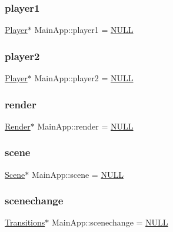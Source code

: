 \subsubsection{\texorpdfstring{player1}{player1}}
{\footnotesize\ttfamily \mbox{\hyperlink{class_player}{Player}}$\ast$ Main\+App\+::player1 = \mbox{\hyperlink{_defs_8h_a070d2ce7b6bb7e5c05602aa8c308d0c4}{N\+U\+LL}}}

\mbox{\label{class_main_app_a294df033f18318eb240fa8e991ec0811}} 
\subsubsection{\texorpdfstring{player2}{player2}}
{\footnotesize\ttfamily \mbox{\hyperlink{class_player}{Player}}$\ast$ Main\+App\+::player2 = \mbox{\hyperlink{_defs_8h_a070d2ce7b6bb7e5c05602aa8c308d0c4}{N\+U\+LL}}}

\mbox{\label{class_main_app_aa75ce242cddd00557eb67cf8d098454d}} 
\subsubsection{\texorpdfstring{render}{render}}
{\footnotesize\ttfamily \mbox{\hyperlink{class_render}{Render}}$\ast$ Main\+App\+::render = \mbox{\hyperlink{_defs_8h_a070d2ce7b6bb7e5c05602aa8c308d0c4}{N\+U\+LL}}}

\mbox{\label{class_main_app_af244b9804fb7da7c0163913de2faeb1b}} 
\subsubsection{\texorpdfstring{scene}{scene}}
{\footnotesize\ttfamily \mbox{\hyperlink{class_scene}{Scene}}$\ast$ Main\+App\+::scene = \mbox{\hyperlink{_defs_8h_a070d2ce7b6bb7e5c05602aa8c308d0c4}{N\+U\+LL}}}

\mbox{\label{class_main_app_a1dc54119bf13dd883759de50361dbc1c}} 
\subsubsection{\texorpdfstring{scenechange}{scenechange}}
{\footnotesize\ttfamily \mbox{\hyperlink{class_transitions}{Transitions}}$\ast$ Main\+App\+::scenechange = \mbox{\hyperlink{_defs_8h_a070d2ce7b6bb7e5c05602aa8c308d0c4}{N\+U\+LL}}}

